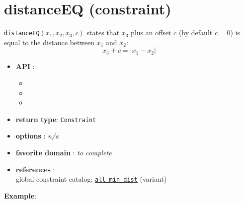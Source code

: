 \label{distanceeq}
\hypertarget{distanceeq}{}

\section{distanceEQ (constraint)}\label{distanceeq:distanceeqconstraint}\hypertarget{distanceeq:distanceeqconstraint}{}
\begin{notedef}
  \texttt{distanceEQ}$(x_1,x_2,x_3,c)$ states that $x_3$ plus an offset $c$ (by default $c=0$) is equal to the distance between $x_1$ and $x_2$:
$$ x_3 + c = | x_1 - x_2 |$$
\end{notedef}

\begin{itemize}
	\item \textbf{API} :
	\begin{itemize}
		\item {}
		\item {}
		\item {}
	\end{itemize}
	\item \textbf{return type}: \texttt{Constraint}
	\item \textbf{options} : \emph{n/a}
	\item \textbf{favorite domain} : \emph{to complete}
	\item \textbf{references} :\\
      global constraint catalog: \href{http://www.emn.fr/x-info/sdemasse/gccat/Call_min_dist.html}{\tt all\_min\_dist} (variant)
\end{itemize}

\textbf{Example}:

